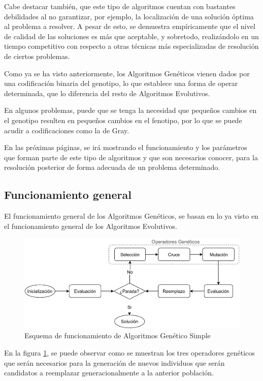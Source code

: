 Cabe destacar también, que este tipo de algoritmos cuentan con bastantes debilidades al no garantizar, por ejemplo, la localización de una solución óptima al problema a resolver. A pesar de esto, se demuestra empíricamente que el nivel de calidad de las soluciones es más que aceptable, y sobretodo, realizándolo en un tiempo competitivo con respecto a otras técnicas más especializadas de resolución de ciertos problemas.

Como ya se ha visto anteriormente, los Algoritmos Genéticos vienen dados por una codificación binaria del genotipo, lo que establece una forma de operar determinada, que lo diferencia del resto de Algoritmos Evolutivos.

En algunos problemas, puede que se tenga la necesidad que pequeños cambios en el genotipo resulten en pequeños cambios en el fenotipo, por lo que se puede acudir a codificaciones como la de Gray.

En las próximas páginas, se irá mostrando el funcionamiento y los parámetros que forman parte de este tipo de algoritmos y que son necesarios conocer, para la resolución posterior de forma adecuada de un problema determinado.

\subsection{Funcionamiento general}

El funcionamiento general de los Algoritmos Genéticos, se basan en lo ya visto en el funcionamiento general de los Algoritmos Evolutivos.

\begin{figure}[h]
    \centering
    \includegraphics[width=\textwidth]{figuras/desarrollo teorico/Esquema_algoritmo_genetico.pdf}
    \caption{Esquema de funcionamiento de Algoritmos Genético Simple}
    \label{fig:diagrama_alg_genetico}
\end{figure}

En la figura \ref{fig:diagrama_alg_genetico}, se puede observar como se muestran los tres operadores genéticos que serán necesarios para la generación de nuevos individuos que serán candidatos a reemplazar generacionalmente a la anterior población.

